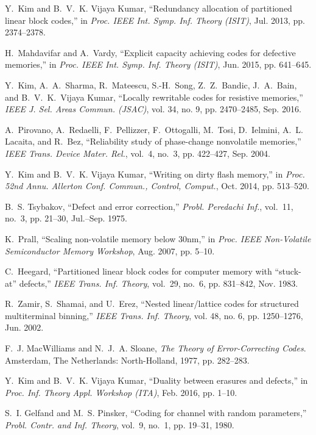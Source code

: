 \documentclass[10pt,twocolumn,twoside,submit]{JCNtran}
\begin{document}
\begin{thebibliography}{99}
Y.~Kim and B.~V.~K. {Vijaya Kumar}, ``{Redundancy allocation of partitioned
	linear block codes},'' in \emph{Proc. {IEEE} Int. Symp. Inf. Theory (ISIT)}, Jul. 2013, pp. 2374--2378.

H.~Mahdavifar and A.~Vardy, ``{Explicit capacity achieving codes for defective
	memories},'' in \emph{Proc. {IEEE} Int. Symp. Inf. Theory (ISIT)}, Jun. 2015, pp. 641--645.

 Y.~Kim, A.~A.~Sharma, R.~Mateescu, S.-H.~Song, Z.~Z.~Bandic, J.~A.~Bain, and B.~V.~K.~Vijaya Kumar, ``{Locally rewritable codes for resistive memories,}'' \emph{IEEE J. Sel. Areas Commun. (JSAC)}, vol. 34, no. 9, pp. 2470--2485, Sep. 2016.

A.~Pirovano, A.~Redaelli, F.~Pellizzer, F.~Ottogalli, M.~Tosi, D.~Ielmini,
A.~L. Lacaita, and R.~Bez, ``{Reliability study of phase-change nonvolatile
	memories},'' \emph{{IEEE} Trans. Device Mater. Rel.}, vol.~4, no.~3, pp.
422--427, Sep. 2004.

Y.~Kim and B.~V.~K. {Vijaya Kumar}, ``Writing on dirty flash memory,'' in
\emph{Proc. 52nd Annu. Allerton Conf. Commun., Control, Comput.}, Oct. 2014, pp. 513--520.

B.~S. Tsybakov, ``{Defect and error correction},'' \emph{Probl. Peredachi
	Inf.}, vol.~11, no.~3, pp. 21--30, Jul.--Sep. 1975.

K.~Prall, ``{Scaling non-volatile memory below 30nm},'' in \emph{Proc. {IEEE} Non-Volatile Semiconductor Memory Workshop}, Aug. 2007, pp. 5--10.

C.~Heegard, ``{Partitioned linear block codes for computer memory with
	``stuck-at'' defects},'' \emph{{IEEE} Trans. Inf. Theory}, vol.~29, no.~6,
pp. 831--842, Nov. 1983.

R.~Zamir, S.~Shamai, and U.~Erez, ``{Nested linear/lattice codes for structured multiterminal binning},''  \emph{{IEEE} Trans. Inf. Theory}, vol. 48, no. 6, pp. 1250--1276, Jun. 2002.

F.~J. MacWilliams and N.~J.~A. Sloane, \emph{{The Theory of Error-Correcting Codes}}. Amsterdam, The Netherlands:
North-Holland, 1977, pp. 282--283.

Y.~Kim and B.~V.~K. {Vijaya Kumar}, ``Duality between erasures and defects,'' in \emph{Proc. Inf. Theory Appl. Workshop (ITA)}, Feb. 2016, pp. 1--10.

S.~I. Gelfand and M.~S. Pinsker, ``{Coding for channel with random 	parameters},'' \emph{Probl. Contr. and Inf. Theory}, vol.~9, no.~1, pp.
19--31, 1980.


\end{thebibliography}





\end{document}
